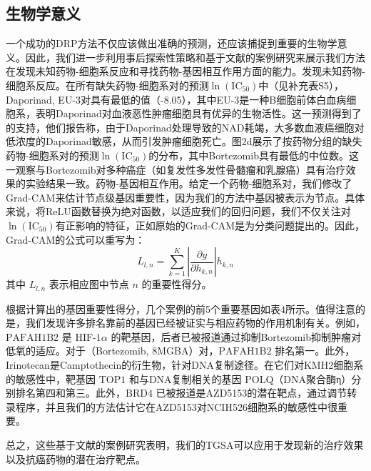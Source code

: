 \subsection{生物学意义}
一个成功的DRP方法不仅应该做出准确的预测，还应该捕捉到重要的生物学意义。因此，我们进一步利用事后探索性策略和基于文献的案例研究来展示我们方法在发现未知药物-细胞系反应和寻找药物-基因相互作用方面的能力。发现未知药物-细胞系反应。在所有缺失药物-细胞系对的预测\(\ln(\text{IC}_{50})\)中（见补充表S5），Daporinad, EU-3对具有最低的值（-8.05），其中EU-3是一种B细胞前体白血病细胞系，表明Daporinad对血液恶性肿瘤细胞具有优异的生物活性。这一预测得到了\cite{Nahimana2009}的支持，他们报告称，由于Daporinad处理导致的NAD耗竭，大多数血液癌细胞对低浓度的Daporinad敏感，从而引发肿瘤细胞死亡。图2d展示了按药物分组的缺失药物-细胞系对的预测\(\ln(\text{IC}_{50})\)的分布，其中Bortezomib具有最低的中位数。这一观察与Bortezomib对多种癌症（如复发性多发性骨髓瘤\cite{Richardson2003}和乳腺癌\cite{PeriyasamyThandavan2010}）具有治疗效果的实验结果一致。药物-基因相互作用。给定一个药物-细胞系对，我们修改了Grad-CAM\cite{Selvaraju2017}来估计节点级基因重要性，因为我们的方法中基因被表示为节点。具体来说，将ReLU函数替换为绝对函数，以适应我们的回归问题，我们不仅关注对\(\ln(\text{IC}_{50})\)有正影响的特征，正如原始的Grad-CAM是为分类问题提出的。因此，Grad-CAM的公式可以重写为：
\[
L_{l,n} = \sum_{k=1}^{K} \left| \frac{\partial y}{\partial h_{k,n}} \right| h_{k,n}
\]
其中 \( L_{l,n} \) 表示相应图中节点 \( n \) 的重要性得分。

根据计算出的基因重要性得分，几个案例的前5个重要基因如表4所示。值得注意的是，我们发现许多排名靠前的基因已经被证实与相应药物的作用机制有关。例如，\( \text{PAFAH1B2} \) 是 \( \text{HIF-1}\alpha \) 的靶基因\cite{Ma2018}，后者已被报道通过抑制Bortezomib抑制肿瘤对低氧的适应\cite{Shin2008}。对于（Bortezomib, 8MGBA）对，\( \text{PAFAH1B2} \) 排名第一。此外，Irinotecan是Camptothecin的衍生物，针对DNA复制途径\cite{Pommier2006}。在它们对KMH2细胞系的敏感性中，靶基因 \( \text{TOP1} \) 和与DNA复制相关的基因 \( \text{POLQ} \)（DNA聚合酶η）分别排名第四和第三。此外，\( \text{BRD4} \) 已被报道是AZD5153的潜在靶点，通过调节转录程序\cite{Rhyasen2016}，并且我们的方法估计它在AZD5153对NCIH526细胞系的敏感性中很重要。

总之，这些基于文献的案例研究表明，我们的TGSA可以应用于发现新的治疗效果以及抗癌药物的潜在治疗靶点。

